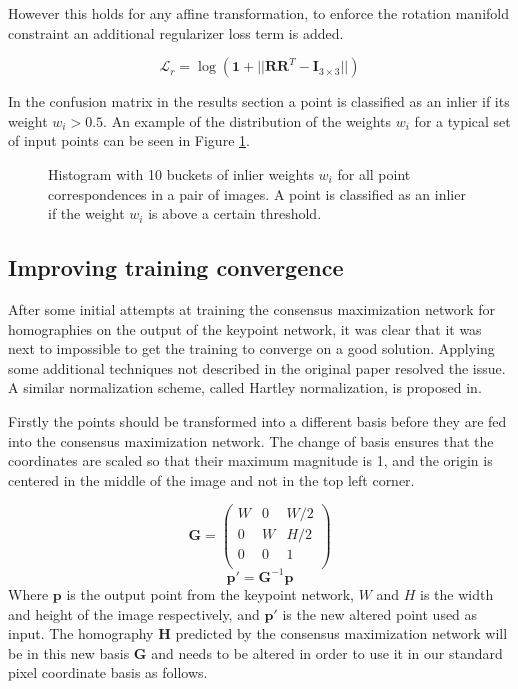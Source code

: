 However this holds for any affine transformation, to enforce the rotation manifold constraint an additional regularizer loss term is added.

\[
\mathcal{L}_r=\log(\textbf{1} + || \textbf{R}\textbf{R}^T - \textbf{I}_{3\times3} ||)
\]

In the confusion matrix in the results section a point is classified as an inlier if its weight $w_i>0.5$. An example of the distribution of the weights $w_i$ for a typical set of input points can be seen in Figure \ref{fig:w-hist}.


\begin{figure}[H]
	\begin{center}
		
	\end{center}
	\caption{Histogram with 10 buckets of inlier weights $w_i$ for all point correspondences in a pair of images. A point is classified as an inlier if the weight $w_i$ is above a certain threshold.}
	\label{fig:w-hist}
\end{figure}

\subsection{Improving training convergence}

After some initial attempts at training the consensus maximization network for homographies on the output of the keypoint network, it was clear that it was next to impossible to get the training to converge on a good solution. Applying some additional techniques not described in the original paper resolved the issue. A similar normalization scheme, called Hartley normalization, is proposed in\cite{8-point}.

Firstly the points should be transformed into a different basis before they are fed into the consensus maximization network. The change of basis ensures that the coordinates are scaled so that their maximum magnitude is 1, and the origin is centered in the middle of the image and not in the top left corner.

\begin{equation}
\textbf{G}=
\begin{pmatrix}
W & 0 & W/2 \\
0 & W & H/2 \\
0 & 0 & 1 \\
\end{pmatrix}
\end{equation}
\begin{equation}
\textbf{p}' = \textbf{G}^{-1} \textbf{p}
\end{equation}
Where $\textbf{p}$ is the output point from the keypoint network, $W$ and $H$ is the width and height of the image respectively, and $\textbf{p}'$ is the new altered point used as input. The homography $\textbf{H}$ predicted by the consensus maximization network will be in this new basis $\textbf{G}$ and needs to be altered in order to use it in our standard pixel coordinate basis as follows.

